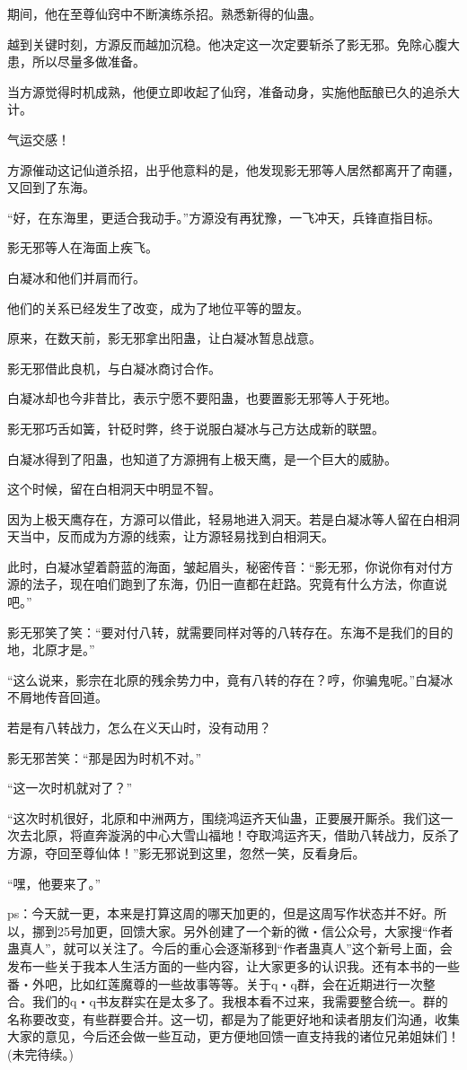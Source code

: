 \begin{this_body}
期间，他在至尊仙窍中不断演练杀招。熟悉新得的仙蛊。

越到关键时刻，方源反而越加沉稳。他决定这一次定要斩杀了影无邪。免除心腹大患，所以尽量多做准备。

当方源觉得时机成熟，他便立即收起了仙窍，准备动身，实施他酝酿已久的追杀大计。

气运交感！

方源催动这记仙道杀招，出乎他意料的是，他发现影无邪等人居然都离开了南疆，又回到了东海。

“好，在东海里，更适合我动手。”方源没有再犹豫，一飞冲天，兵锋直指目标。

影无邪等人在海面上疾飞。

白凝冰和他们并肩而行。

他们的关系已经发生了改变，成为了地位平等的盟友。

原来，在数天前，影无邪拿出阳蛊，让白凝冰暂息战意。

影无邪借此良机，与白凝冰商讨合作。

白凝冰却也今非昔比，表示宁愿不要阳蛊，也要置影无邪等人于死地。

影无邪巧舌如簧，针砭时弊，终于说服白凝冰与己方达成新的联盟。

白凝冰得到了阳蛊，也知道了方源拥有上极天鹰，是一个巨大的威胁。

这个时候，留在白相洞天中明显不智。

因为上极天鹰存在，方源可以借此，轻易地进入洞天。若是白凝冰等人留在白相洞天当中，反而成为方源的线索，让方源轻易找到白相洞天。

此时，白凝冰望着蔚蓝的海面，皱起眉头，秘密传音：“影无邪，你说你有对付方源的法子，现在咱们跑到了东海，仍旧一直都在赶路。究竟有什么方法，你直说吧。”

影无邪笑了笑：“要对付八转，就需要同样对等的八转存在。东海不是我们的目的地，北原才是。”

“这么说来，影宗在北原的残余势力中，竟有八转的存在？哼，你骗鬼呢。”白凝冰不屑地传音回道。

若是有八转战力，怎么在义天山时，没有动用？

影无邪苦笑：“那是因为时机不对。”

“这一次时机就对了？”

“这次时机很好，北原和中洲两方，围绕鸿运齐天仙蛊，正要展开厮杀。我们这一次去北原，将直奔漩涡的中心大雪山福地！夺取鸿运齐天，借助八转战力，反杀了方源，夺回至尊仙体！”影无邪说到这里，忽然一笑，反看身后。

“嘿，他要来了。”

ps：今天就一更，本来是打算这周的哪天加更的，但是这周写作状态并不好。所以，挪到25号加更，回馈大家。另外创建了一个新的微・信公众号，大家搜“作者蛊真人”，就可以关注了。今后的重心会逐渐移到“作者蛊真人”这个新号上面，会发布一些关于我本人生活方面的一些内容，让大家更多的认识我。还有本书的一些番・外吧，比如红莲魔尊的一些故事等等。关于q・q群，会在近期进行一次整合。我们的q・q书友群实在是太多了。我根本看不过来，我需要整合统一。群的名称要改变，有些群要合并。这一切，都是为了能更好地和读者朋友们沟通，收集大家的意见，今后还会做一些互动，更方便地回馈一直支持我的诸位兄弟姐妹们！(未完待续。)

\end{this_body}

